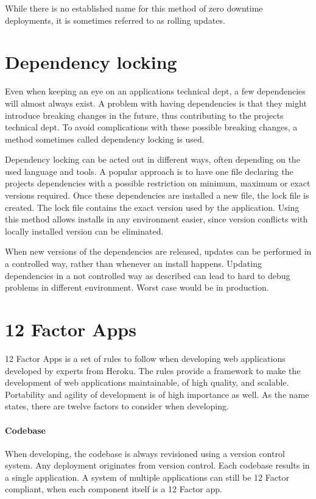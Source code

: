 While there is no established name for this method of zero downtime
deployments, it is sometimes referred to as rolling updates.

\section{Dependency locking}

Even when keeping an eye on an applications technical dept, a few dependencies
will almost always exist. A problem with having dependencies is that they might
introduce breaking changes in the future, thus contributing to the projects
technical dept. To avoid complications with these possible breaking changes, a
method sometimes called dependency locking is used.

Dependency locking can be acted out in different ways, often depending on the
used language and tools. A popular approach is to have one file declaring the
projects dependencies with a possible restriction on minimum, maximum or exact
versions required. Once these dependencies are installed a new file, the lock
file is created. The lock file contains the exact version used by the
application. Using this method allows installs in any environment easier, since
version conflicts with locally installed version can be eliminated.

When new versions of the dependencies are released, updates can be performed in
a controlled way, rather than whenever an install happens. Updating
dependencies in a not controlled way as described can lead to hard to debug
problems in different environment. Worst case would be in production.

\section{12 Factor Apps}

12 Factor Apps is a set of rules to follow when developing web applications
developed by experts from Heroku. The rules provide a framework to make the
development of web applications maintainable, of high quality, and scalable.
Portability and agility of development is of high importance as well. As the
name states, there are twelve factors to consider when developing.

\paragraph{Codebase}

When developing, the codebase is always revisioned using a version control
system. Any deployment originates from version control. Each codebase results
in a single application. A system of multiple applications can still be 12
Factor compliant, when each component itself is a 12 Factor app.

